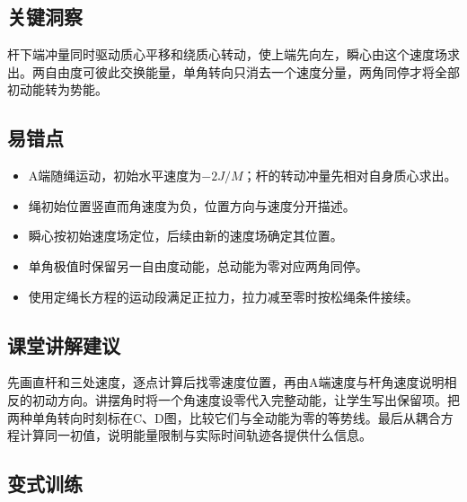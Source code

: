 \documentclass[UTF8,fontset=fandol,a4paper,11pt]{ctexart}
\begin{document}

\subsection*{关键洞察}

杆下端冲量同时驱动质心平移和绕质心转动，使上端先向左，瞬心由这个速度场求出。两自由度可彼此交换能量，单角转向只消去一个速度分量，两角同停才将全部初动能转为势能。



\subsection*{易错点}

\begin{itemize}
\item A端随绳运动，初始水平速度为$-2J/M$；杆的转动冲量先相对自身质心求出。
\item 绳初始位置竖直而角速度为负，位置方向与速度分开描述。
\item 瞬心按初始速度场定位，后续由新的速度场确定其位置。
\item 单角极值时保留另一自由度动能，总动能为零对应两角同停。
\item 使用定绳长方程的运动段满足正拉力，拉力减至零时按松绳条件接续。\end{itemize}



\subsection*{课堂讲解建议}

先画直杆和三处速度，逐点计算后找零速度位置，再由A端速度与杆角速度说明相反的初动方向。讲摆角时将一个角速度设零代入完整动能，让学生写出保留项。把两种单角转向时刻标在C、D图，比较它们与全动能为零的等势线。最后从耦合方程计算同一初值，说明能量限制与实际时间轨迹各提供什么信息。



\subsection*{变式训练}
\end{document}
